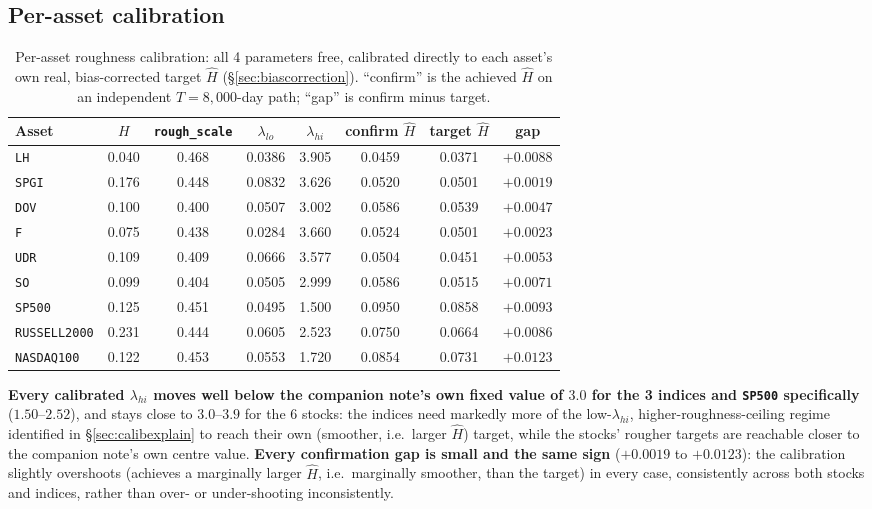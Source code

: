 \documentclass[11pt]{article}
\begin{document}
\subsection{Per-asset calibration}
\begin{table}[h]
\centering
\caption{Per-asset roughness calibration: all 4 parameters free, calibrated
directly to each asset's own real, bias-corrected target $\hat H$
(\S\ref{sec:biascorrection}). ``confirm'' is the achieved $\hat H$ on an
independent $T=8{,}000$-day path; ``gap'' is confirm minus target.}
\label{tab:roughness}
\begin{tabular}{lccccccc}
\toprule
Asset & $H$ & \texttt{rough\_scale} & $\lambda_{lo}$ & $\lambda_{hi}$ & confirm $\hat H$ & target $\hat H$ & gap \\
\midrule
\texttt{LH}          & 0.040 & 0.468 & 0.0386 & 3.905 & 0.0459 & 0.0371 & $+0.0088$ \\
\texttt{SPGI}        & 0.176 & 0.448 & 0.0832 & 3.626 & 0.0520 & 0.0501 & $+0.0019$ \\
\texttt{DOV}         & 0.100 & 0.400 & 0.0507 & 3.002 & 0.0586 & 0.0539 & $+0.0047$ \\
\texttt{F}           & 0.075 & 0.438 & 0.0284 & 3.660 & 0.0524 & 0.0501 & $+0.0023$ \\
\texttt{UDR}         & 0.109 & 0.409 & 0.0666 & 3.577 & 0.0504 & 0.0451 & $+0.0053$ \\
\texttt{SO}          & 0.099 & 0.404 & 0.0505 & 2.999 & 0.0586 & 0.0515 & $+0.0071$ \\
\texttt{SP500}       & 0.125 & 0.451 & 0.0495 & 1.500 & 0.0950 & 0.0858 & $+0.0093$ \\
\texttt{RUSSELL2000} & 0.231 & 0.444 & 0.0605 & 2.523 & 0.0750 & 0.0664 & $+0.0086$ \\
\texttt{NASDAQ100}   & 0.122 & 0.453 & 0.0553 & 1.720 & 0.0854 & 0.0731 & $+0.0123$ \\
\bottomrule
\end{tabular}
\end{table}

\textbf{Every calibrated $\lambda_{hi}$ moves well below the companion note's own
fixed value of $3.0$ for the 3 indices and \texttt{SP500} specifically}
($1.50$--$2.52$), and stays close to $3.0$--$3.9$ for the 6 stocks: the indices
need markedly more of the low-$\lambda_{hi}$, higher-roughness-ceiling regime
identified in \S\ref{sec:calibexplain} to reach their own (smoother, i.e.\ larger
$\hat H$) target, while the stocks' rougher targets are reachable closer to the
companion note's own centre value. \textbf{Every confirmation gap is small and the
same sign} ($+0.0019$ to $+0.0123$): the calibration slightly overshoots (achieves
a marginally larger $\hat H$, i.e.\ marginally smoother, than the target) in every
case, consistently across both stocks and indices, rather than over- or
under-shooting inconsistently.
\end{document}
